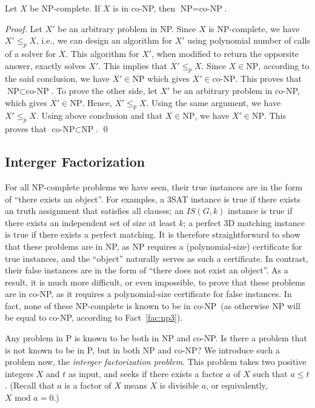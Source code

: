 \begin{fact}
Let $X$ be NP-complete. If $X$ is in co-NP, then $\textrm{NP} = \textrm{co-NP}$.
\label{fac:np3}
\end{fact}
\emph{Proof.} Let $X'$ be an arbitrary problem in NP.
Since $X$ is NP-complete, we have $X' \le_p X$, i.e., we can design an
algorithm for $X'$ using polynomial number of calls of a solver for $X$.
This algorithm for $X'$, when modified to return the opporsite answer, exactly solves $\overline{X'}$.
This implies that $\overline{X'} \le_p X$. 
Since $X\in\textrm{NP}$, according to the said conclusion,
we have $\overline{X'}\in\textrm{NP}$ which gives $X'\in\textrm{co-NP}$.
This proves that $\textrm{NP}\subset \textrm{co-NP}$.
To prove the other side, let $X'$ be an arbitrary problem in co-NP, which gives $\overline{X'} \in \textrm{NP}$.
Hence, $\overline{X'} \le_p X$. Using the same argument, we have $X'\le_p X$.
Using above conclusion and that $X\in \textrm{NP}$, we have $X'\in\textrm{NP}$.
This proves that $\textrm{co-NP}\subset\textrm{NP}$. \qed

\subsection*{Interger Factorization}

For all NP-complete problems we have seen, %
their true instances are in the form of ``there exists an object''.
For examples, a 3SAT instance is true if there exists an truth assignment that satisfies all clauses;
an $IS(G, k)$ instance is true if there exists an independent set of size at least $k$;
a perfect 3D matching instance is true if there exists a perfect matching.
It is therefore straightforward to show that these problems are in NP,
as NP requires a (polynomial-size) certificate for true instances, and
the ``object'' naturally serves as such a certificate.
In contrast, their false instances are in the form of 
``there does not exist an object''. As a result, it is much more difficult, or even impossible,
to prove that these problems are in co-NP, as it requires a polynomial-size certificate for false instances. 
In fact, none of these NP-complete is known to be in co-NP~(as otherwise NP will be equal to co-NP, according
to Fact~\ref{fac:np3}).

Any problem in P is known to be both in NP and co-NP.
Is there a problem that is not known to be in P, but in both NP and co-NP?
We introduce such a problem now, the \emph{interger factorization problem}. 
This problem takes two positive integers $X$ and $t$ as input,
and seeks if there exists a factor $a$ of $X$ such that $a\le t$.
(Recall that $a$ is a factor of $X$ means $X$ is divisible $a$, or equivalently, $X \textrm{ mod } a = 0$.)


